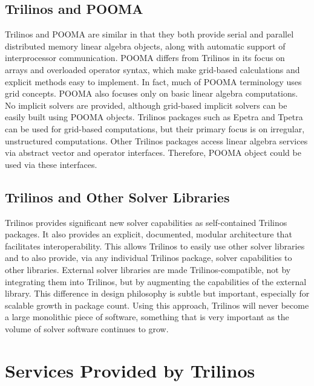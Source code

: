 \documentclass[acmtoms,acmnow]{acmtrans2m}
\begin{document}
\subsection{Trilinos and POOMA}

Trilinos and POOMA are similar in that they both provide serial and parallel
distributed memory linear algebra objects, along with automatic support of
interprocessor communication.   POOMA differs from Trilinos in its
focus on arrays and overloaded operator syntax, which make
grid-based calculations and explicit methods easy to implement.  In
fact, much of POOMA terminology uses grid concepts.  POOMA also focuses
only on basic linear algebra computations.  No implicit solvers are
provided, although grid-based implicit solvers can be easily built
using POOMA objects.
Trilinos packages such as Epetra and Tpetra can be used for grid-based
computations, but their primary focus is on
irregular, unstructured computations.  Other Trilinos packages access
linear algebra services via abstract vector and operator interfaces.
Therefore, POOMA object could be used via these interfaces. 

\subsection{Trilinos and Other Solver Libraries}
Trilinos provides significant new solver capabilities as 
self-contained Trilinos packages.  It also provides an explicit,
documented, modular architecture that 
facilitates interoperability.  This allows Trilinos to easily use
other solver libraries and to also provide, via any individual Trilinos
package, solver capabilities to other libraries. External solver
libraries are made Trilinos-compatible, not by integrating them into
Trilinos, but by augmenting the capabilities of the external library.
This difference in design philosophy is subtle but important,
especially for scalable growth in package count.  Using this approach,
Trilinos will never become a large monolithic piece of software,
something that is very important as the volume of solver software
continues to grow.

\section{Services Provided by Trilinos}
\label{sect:TrilinosServices}
\end{document}
